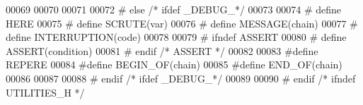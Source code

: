 \begin{DoxyCode}
00069 
00070 
00071 
00072 \textcolor{preprocessor}{# else }\textcolor{comment}{/* ifdef \_DEBUG\_*/}\textcolor{preprocessor}{}
00073 
00074 \textcolor{preprocessor}{# define HERE}
00075 \textcolor{preprocessor}{# define SCRUTE(var)}
00076 \textcolor{preprocessor}{# define MESSAGE(chain)}
00077 \textcolor{preprocessor}{# define INTERRUPTION(code)}
00078 
00079 \textcolor{preprocessor}{# ifndef ASSERT}
00080 \textcolor{preprocessor}{# define ASSERT(condition)}
00081 \textcolor{preprocessor}{# endif }\textcolor{comment}{/* ASSERT */}\textcolor{preprocessor}{}
00082 
00083 \textcolor{preprocessor}{#define REPERE}
00084 \textcolor{preprocessor}{#define BEGIN\_OF(chain)}
00085 \textcolor{preprocessor}{#define END\_OF(chain)}
00086 
00087 
00088 \textcolor{preprocessor}{# endif }\textcolor{comment}{/* ifdef \_DEBUG\_*/}\textcolor{preprocessor}{}
00089 
00090 \textcolor{preprocessor}{# endif }\textcolor{comment}{/* ifndef UTILITIES\_H */}\textcolor{preprocessor}{}
\end{DoxyCode}
